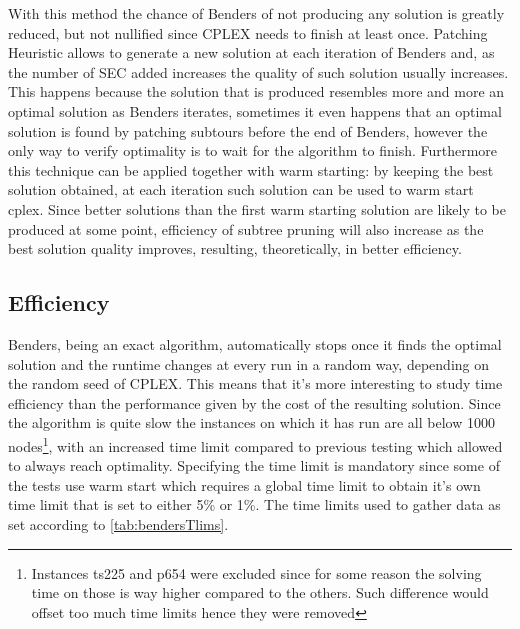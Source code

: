 With this method the chance of Benders of not producing any solution is greatly reduced, but not nullified since CPLEX needs to finish at least once.
Patching Heuristic allows to generate a new solution at each iteration of Benders and, as the number of SEC added increases the quality of such solution usually increases.
This happens because the solution that is produced resembles more and more an optimal solution as Benders iterates, sometimes it even happens that an optimal solution is found by patching subtours before the end of Benders, however the only way to verify optimality is to wait for the algorithm to finish.
Furthermore this technique can be applied together with warm starting: by keeping the best solution obtained, at each iteration such solution can be used to warm start cplex.
Since better solutions than the first warm starting solution are likely to be produced at some point, efficiency of subtree pruning will also increase as the best solution quality improves, resulting, theoretically, in better efficiency.

\subsection{Efficiency}
Benders, being an exact algorithm, automatically stops once it finds the optimal solution and the runtime changes at every run in a random way, depending on the random seed of CPLEX. 
This means that it's more interesting to study time efficiency than the performance given by the cost of the resulting solution.
Since the algorithm is quite slow the instances on which it has run are all below 1000 nodes\footnote{Instances ts225 and p654 were excluded since for some reason the solving time on those is way higher compared to the others. Such difference would offset too much time limits hence they were removed}, with an increased time limit compared to previous testing which allowed to always reach optimality.
Specifying the time limit is mandatory since some of the tests use warm start which requires a global time limit to obtain it's own time limit that is set to either 5\% or 1\%.
The time limits used to gather data as set according to \tablename{ \ref{tab:bendersTlims}}.

